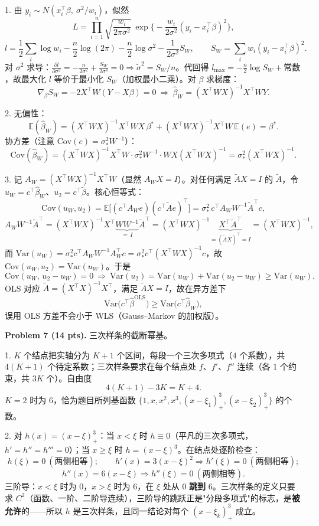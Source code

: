 \documentclass[11pt]{ctexart}
\newcommand{\ans}[1]{{\color{red}#1}}
\begin{document}
\ans{
1. 由 $y_i \sim N(x_i^{\top}\beta,\ \sigma^2/w_i)$，似然
\[
L = \prod_{i=1}^n \sqrt{\frac{w_i}{2\pi\sigma^2}}\ \exp\Big\{-\frac{w_i}{2\sigma^2}(y_i - x_i^{\top}\beta)^2\Big\},
\]
\[
l = \frac{1}{2}\sum_i \log w_i - \frac{n}{2}\log(2\pi) - \frac{n}{2}\log\sigma^2 - \frac{1}{2\sigma^2}S_W, \qquad S_W = \sum_i w_i(y_i - x_i^{\top}\beta)^2.
\]
对 $\sigma^2$ 求导：$\frac{\partial l}{\partial \sigma^2} = -\frac{n}{2\sigma^2} + \frac{S_W}{2\sigma^4} = 0 \Rightarrow \tilde\sigma^2 = S_W/n$。代回得 $l_{\max} = -\frac{n}{2}\log S_W + \text{常数}$，故最大化 $l$ 等价于最小化 $S_W$（加权最小二乘）。对 $\beta$ 求梯度：
\[
\nabla_\beta S_W = -2X^{\top}W(Y - X\beta) = 0 \ \Longrightarrow\ \hat\beta_W = (X^{\top}WX)^{-1}X^{\top}WY.
\]

2. 无偏性：
\[
\mathbb{E}(\hat\beta_W) = (X^{\top}WX)^{-1}X^{\top}WX\,\beta^* + (X^{\top}WX)^{-1}X^{\top}W\,\mathbb{E}(e) = \beta^*.
\]
协方差（注意 $\mathrm{Cov}(e) = \sigma_*^2W^{-1}$）：
\[
\mathrm{Cov}(\hat\beta_W) = (X^{\top}WX)^{-1}X^{\top}W \cdot \sigma_*^2W^{-1} \cdot WX(X^{\top}WX)^{-1} = \sigma_*^2(X^{\top}WX)^{-1}.
\]

3. 记 $A_W = (X^{\top}WX)^{-1}X^{\top}W$（显然 $A_WX = I$）。对任何满足 $\tilde{A}X = I$ 的 $\tilde{A}$，令 $u_W = c^{\top}\hat\beta_W$、$u_2 = c^{\top}\tilde\beta$。核心恒等式：
\[
\mathrm{Cov}(u_W, u_2) = \mathbb{E}\big[(c^{\top}A_We)(c^{\top}\tilde{A}e)^{\top}\big] = \sigma_*^2\,c^{\top}A_WW^{-1}\tilde{A}^{\top}c,
\]
\[
A_WW^{-1}\tilde{A}^{\top} = (X^{\top}WX)^{-1}X^{\top}\underbrace{WW^{-1}}_{=\,I}\tilde{A}^{\top} = (X^{\top}WX)^{-1}\underbrace{X^{\top}\tilde{A}^{\top}}_{=(\tilde{A}X)^{\top}=I} = (X^{\top}WX)^{-1},
\]
而 $\mathrm{Var}(u_W) = \sigma_*^2c^{\top}A_WW^{-1}A_W^{\top}c = \sigma_*^2c^{\top}(X^{\top}WX)^{-1}c$，故 $\mathrm{Cov}(u_W,u_2) = \mathrm{Var}(u_W)$。于是
\[
\mathrm{Cov}(u_W,\, u_2 - u_W) = 0 \ \Longrightarrow\ \mathrm{Var}(u_2) = \mathrm{Var}(u_W) + \mathrm{Var}(u_2 - u_W) \geq \mathrm{Var}(u_W).
\]
OLS 对应 $\tilde{A} = (X^{\top}X)^{-1}X^{\top}$，满足 $\tilde{A}X = I$，故在异方差下
\[
\mathrm{Var}\big(c^{\top}\hat\beta^{\mathrm{OLS}}\big) \geq \mathrm{Var}\big(c^{\top}\hat\beta_W\big),
\]
误用 OLS 方差不会小于 WLS（Gauss--Markov 的加权版）。
}

\noindent\textbf{Problem 7 (14 pts).} 三次样条的截断幂基。

\ans{
1. $K$ 个结点把实轴分为 $K+1$ 个区间，每段一个三次多项式（$4$ 个系数），共 $4(K{+}1)$ 个待定系数；三次样条要求在每个结点处 $f$、$f'$、$f''$ 连续（各 $1$ 个约束，共 $3K$ 个）。自由度
\[
4(K+1) - 3K = K + 4.
\]
$K = 2$ 时为 $6$，恰为题目所列基函数 $\{1, x, x^2, x^3, (x-\xi_1)_+^3, (x-\xi_2)_+^3\}$ 的个数。

2. 对 $h(x) = (x-\xi)_+^3$：当 $x < \xi$ 时 $h \equiv 0$（平凡的三次多项式，$h' = h'' = h''' = 0$）；当 $x \geq \xi$ 时 $h = (x-\xi)^3$。在结点处逐阶检查：
\[
h(\xi) = 0 \ (\text{两侧相等}); \qquad h'(x) = 3(x-\xi)^2 \Rightarrow h'(\xi) = 0 \ (\text{两侧相等});
\]
\[
h''(x) = 6(x-\xi) \Rightarrow h''(\xi) = 0 \ (\text{两侧相等}).
\]
三阶导：$x < \xi$ 时为 $0$，$x > \xi$ 时为 $6$，在 $\xi$ 处从 $0$ \textbf{跳到} $6$。三次样条的定义只要求 $C^2$（函数、一阶、二阶导连续），三阶导的跳跃正是"分段多项式"的标志，是\textbf{被允许}的——所以 $h$ 是三次样条，且同一结论对每个 $(x-\xi_k)_+^3$ 成立。
}
\end{document}
